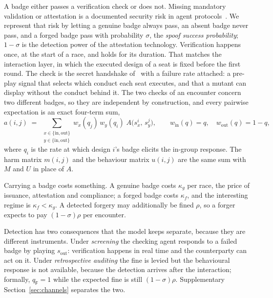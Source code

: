 \documentclass[preprint,12pt]{elsarticle}
\theoremstyle{plain}
\theoremstyle{definition}
\begin{document}
A badge either passes a verification check or does not. Missing mandatory
validation or attestation is a documented security risk in agent
protocols~\citep{anbiaee2026threatmodeling}. We represent that risk by letting a
genuine badge always pass, an absent badge never pass, and a forged badge pass
with probability $\sigma$, the \emph{spoof success probability}; $1 - \sigma$
is the detection power of the attestation technology. Verification happens once, at
the start of a race, and holds for its duration. That matches the interaction
layer, in which the executed design of a seat is fixed before the first round.
The check is the secret handshake of~\citet{robson1990efficiency} with a failure
rate attached: a pre-play signal that selects which conduct each seat executes,
and that a mutant can display without the conduct behind it.
The two checks of an encounter concern two different badges, so they are
independent by construction, and every pairwise expectation is an exact
four-term sum,
\begin{equation}
\label{eq:handshake}
a(i, j) \;=\; \sum_{\substack{x \in \{\mathrm{in}, \mathrm{out}\} \\
                              y \in \{\mathrm{in}, \mathrm{out}\}}}
  w_x(q_j)\, w_y(q_i)\; A\big(s^{i}_{x},\, s^{j}_{y}\big),
\qquad
w_{\mathrm{in}}(q) = q, \quad w_{\mathrm{out}}(q) = 1 - q,
\end{equation}
where $q_i$ is the rate at which design $i$'s badge elicits the in-group
response. The harm matrix $m(i,j)$ and the behaviour matrix $u(i,j)$ are the
same sum with $M$ and $U$ in place of $A$.

Carrying a badge costs something. A genuine badge costs $\kappa_g$ per race,
the price of issuance, attestation and compliance; a forged badge costs
$\kappa_f$, and the interesting regime is $\kappa_f < \kappa_g$. A detected
forgery may additionally be fined $\rho$, so a forger expects to pay
$(1 - \sigma)\rho$ per encounter.

Detection has two consequences that the model keeps separate, because they are
different instruments. Under \emph{screening} the checking agent responds to a
failed badge by playing $s_{\mathrm{out}}$: verification happens in real time
and the counterparty can act on it. Under \emph{retrospective auditing} the
fine is levied but the behavioural response is not available, because the
detection arrives after the interaction; formally, $q_{\mathsf{F}} = 1$ while
the expected fine is still $(1 - \sigma)\rho$. Supplementary Section~\ref{sec:channels} separates the two.
\end{document}
